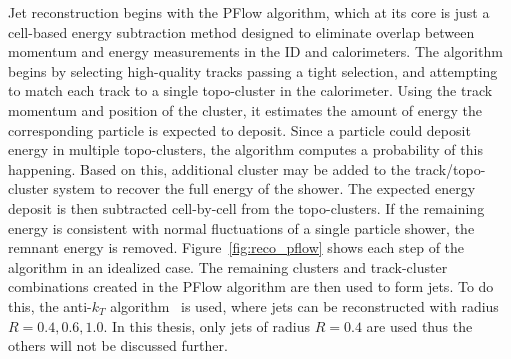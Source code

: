 Jet reconstruction begins with the PFlow algorithm, which at its core is just a cell-based energy subtraction method designed to eliminate overlap between momentum and energy measurements in the ID and calorimeters. The algorithm begins by selecting high-quality tracks passing a tight selection, and attempting to match each track to a single topo-cluster in the calorimeter. Using the track momentum and position of the cluster, it estimates the amount of energy the corresponding particle is expected to deposit. Since a particle could deposit energy in multiple topo-clusters, the algorithm computes a probability of this happening. Based on this, additional cluster may be added to the track/topo-cluster system to recover the full energy of the shower. The expected energy deposit is then subtracted cell-by-cell from the topo-clusters. If the remaining energy is consistent with normal fluctuations of a single particle shower, the remnant energy is removed. Figure~\ref{fig:reco_pflow} shows each step of the algorithm in an idealized case. The remaining clusters and track-cluster combinations created in the PFlow algorithm are then used to form jets. To do this, the anti-$k_T$ algorithm~\cite{Cacciari:2008gp} is used, where jets can be reconstructed with radius $R = 0.4, 0.6, 1.0$. In this thesis, only jets of radius $R = 0.4$ are used thus the others will not be discussed further.


